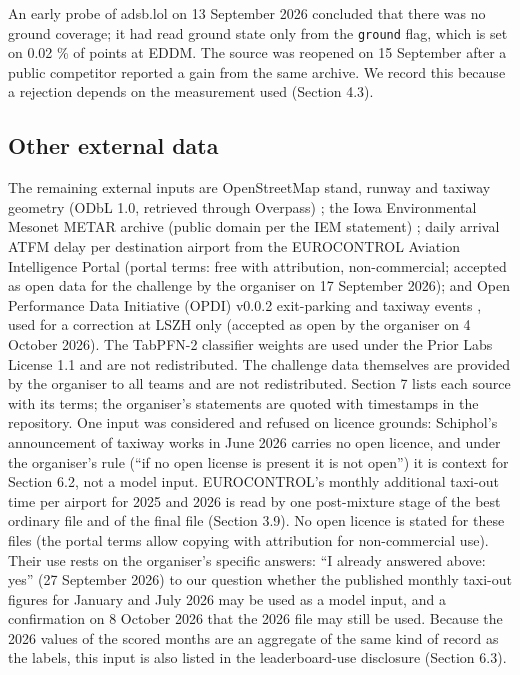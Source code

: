 \documentclass[
  manuscript=article,  %
  layout=preprint,     %
  year=2026,
  volume=4,
]{extra/joas}
\begin{document}
An early probe of adsb.lol on 13 September 2026 concluded that there was no ground coverage; it had read ground state only from the \texttt{ground} flag, which is set on 0.02 \% of points at EDDM. The source was reopened on 15 September after a public competitor reported a gain from the same archive. We record this because a rejection depends on the measurement used (Section 4.3).

\subsection{Other external data}\label{other-external-data}

The remaining external inputs are OpenStreetMap stand, runway and taxiway geometry (ODbL 1.0, retrieved through Overpass) \autocite{osm}; the Iowa Environmental Mesonet METAR archive (public domain per the IEM statement) \autocite{iem}; daily arrival ATFM delay per destination airport from the EUROCONTROL Aviation Intelligence Portal (portal terms: free with attribution, non-commercial; accepted as open data for the challenge by the organiser on 17 September 2026); and Open Performance Data Initiative (OPDI) v0.0.2 exit-parking and taxiway events \autocite{opdi}, used for a correction at LSZH only (accepted as open by the organiser on 4 October 2026). The TabPFN-2 classifier weights are used under the Prior Labs License 1.1 and are not redistributed. The challenge data themselves are provided by the organiser to all teams and are not redistributed. Section 7 lists each source with its terms; the organiser's statements are quoted with timestamps in the repository. One input was considered and refused on licence grounds: Schiphol's announcement of taxiway works in June 2026 carries no open licence, and under the organiser's rule (``if no open license is present it is not open'') it is context for Section 6.2, not a model input. EUROCONTROL's monthly additional taxi-out time per airport for 2025 and 2026 \autocite{eurocontrol2026atxotdata} is read by one post-mixture stage of the best ordinary file and of the final file (Section 3.9). No open licence is stated for these files (the portal terms allow copying with attribution for non-commercial use). Their use rests on the organiser's specific answers: ``I already answered above: yes'' (27 September 2026) to our question whether the published monthly taxi-out figures for January and July 2026 may be used as a model input, and a confirmation on 8 October 2026 that the 2026 file may still be used. Because the 2026 values of the scored months are an aggregate of the same kind of record as the labels, this input is also listed in the leaderboard-use disclosure (Section 6.3).
\end{document}
